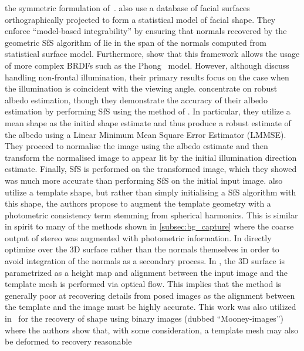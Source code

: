 the symmetric formulation of~\cite{yilmaz2002estimation}.
\citet{smith2010estimating} also use a database of facial surfaces
orthographically projected to form a statistical model of facial shape. They
enforce ``model-based integrability'' by ensuring that normals recovered
by the geometric SfS algorithm of \citet{worthington1999new,Smith:2007eb} lie
in the span of the normals computed from statistical surface model. Furthermore,
\citet{smith2010estimating} show that this framework allows the usage of
more complex BRDFs such as the Phong~\cite{tuong1973illumination} model.
However, although \citet{smith2010estimating} discuss handling non-frontal
illumination, their primary results focus on the case when the illumination
is coincident with the viewing angle.
\citet{biswas2009robust} concentrate on robust albedo estimation, though they
demonstrate the accuracy of their albedo estimation by performing SfS using the
method of \citet{ping1994shape}. In particular, they utilize a mean shape as the
initial shape estimate and thus produce a robust estimate of the albedo using a
Linear Minimum Mean Square Error Estimator (LMMSE). They proceed to normalise
the image using the albedo estimate and then transform the normalised image to
appear lit by the initial illumination direction estimate. Finally, SfS is
performed on the transformed image, which they showed was much more accurate
than performing SfS on the initial input image.
\citet{KemelmacherShlizerman:in} also utilize a template shape, but rather
than simply initialising a SfS algorithm with this shape, the authors propose to
augment the template geometry with a photometric consistency term stemming from
spherical harmonics. This is similar in spirit to many of the methods shown in
\cref{subsec:bg_capture} where the coarse output of stereo was augmented with
photometric information. In \citet{KemelmacherShlizerman:in} directly optimize
over the 3D surface rather than the normals themselves in order to avoid
integration of the normals as a secondary process. In
\citet{KemelmacherShlizerman:in}, the 3D surface is parametrized as a height map
and alignment between the input image and the template mesh is performed via
optical flow. This implies that the method is generally poor at recovering
details from posed images as the alignment between the template and the image
must be highly accurate. This work was also utilized
in~\cite{kemelmacher2008mooney} for the recovery of shape using binary
images (dubbed ``Mooney-images'') where the authors show that, with some
consideration, a template mesh may also be deformed to recovery reasonable
